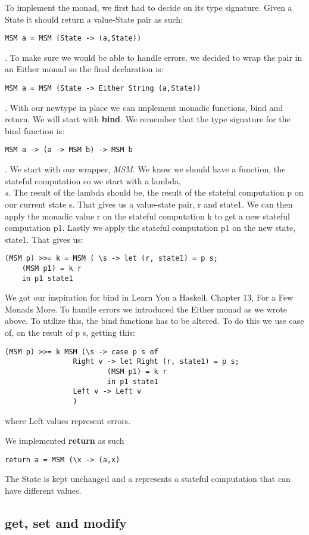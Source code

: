 \documentclass[]{article}
\begin{document}
To implement the monad, we first had to decide on its type signature. Given a State it should return a value-State pair as such: \begin{verbatim}MSM a = MSM (State -> (a,State))\end{verbatim}. To make sure we would be able to handle errors, we decided to wrap the pair in an Either monad so the final declaration is: \begin{verbatim}MSM a = MSM (State -> Either String (a,State))\end{verbatim}.
With our newtype in place we can implement monadic functions, bind and return. 
We will start with \textbf{bind}. We remember that the type signature for the bind function is: 
\begin{verbatim}MSM a -> (a -> MSM b) -> MSM b\end{verbatim}. We start with our wrapper, \emph{MSM}. We know we should have a function, the stateful computation so we start with a lambda, \emph{\\s}. The result of the lambda should be, the result of the stateful computation p on our current state s. That gives us a value-state pair, r and state1. We can then apply the monadic value r on the stateful computation k to get a new stateful computation p1. Lastly we apply the stateful computation p1 on the new state, state1. That gives us: 
\begin{verbatim}(MSM p) >>= k = MSM ( \s -> let (r, state1) = p s;
	(MSM p1) = k r
	in p1 state1
\end{verbatim}
We got our inspiration for bind in Learn You a Haskell, Chapter 13, For a Few Monads More.
To handle errors we introduced the Either monad as we wrote above. To utilize this, the bind functions has to be altered. To do this we use case of, on the result of p s,  getting this:
\begin{verbatim}
(MSM p) >>= k MSM (\s -> case p s of
				Right v -> let Right (r, state1) = p s;
						(MSM p1) = k r
						in p1 state1
				Left v -> Left v
				)
\end{verbatim}
where Left values represent errors.\par
We implemented \textbf{return} as such \begin{verbatim}return a = MSM (\x -> (a,x)\end{verbatim} The State is kept unchanged and a represents a stateful computation that can have different values. \par

\subsection{get, set and modify}
\end{document}
